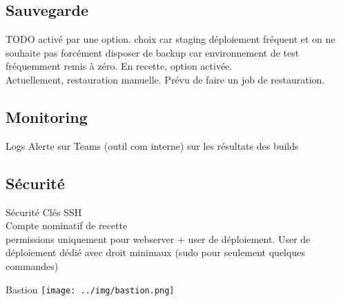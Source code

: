 \subsection{Sauvegarde}
\begin{frame}{\subsecname}
	TODO activé par une option. choix car staging déploiement fréquent et on ne souhaite pas forcément disposer de backup car environnement de test fréquemment remis à zéro. En recette, option activée. \\ 
	
	Actuellement, restauration manuelle. Prévu de faire un job de restauration.
\end{frame}

\subsection{Monitoring}
\begin{frame}{\subsecname}
	Logs
	Alerte sur Teams (outil com interne) sur les résultats des builds
\end{frame}

\subsection{Sécurité}
\begin{frame}{Sécurité}
	Clés SSH  \\
	Compte nominatif de recette \\
	permissions uniquement pour webserver + user de déploiement. 
	User de déploiement dédié avec droit minimaux (sudo pour seulement quelques commandes)
\end{frame}

\begin{frame}{Bastion}
	\centering \texttt{[image: ../img/bastion.png]}
\end{frame}
